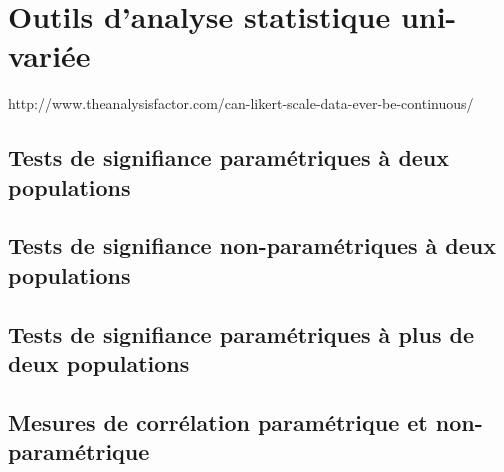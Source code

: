 \chapter{Outils d'analyse statistique uni-variée}
\label{app:statuni}

http://www.theanalysisfactor.com/can-likert-scale-data-ever-be-continuous/

\section{Tests de signifiance paramétriques à deux populations}

\section{Tests de signifiance non-paramétriques à deux populations}

\section{Tests de signifiance paramétriques à plus de deux populations}

\section{Mesures de corrélation paramétrique et non-paramétrique}
